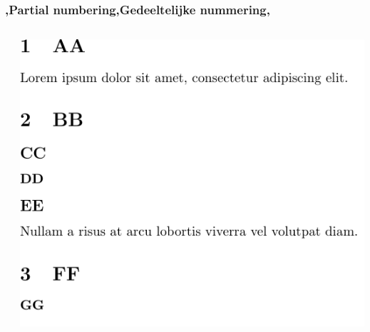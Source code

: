 \begin{frame}
    \frametitle{\lang,Partial numbering,Gedeeltelijke nummering,}
    
    \begin{columns}
        \begin{column}{0.5\textwidth}
        \end{column}
        \begin{column}{0.5\textwidth}
            \includegraphics[width=\linewidth,height=0.8\textheight,keepaspectratio]{assets/partialNumberedSecnumdepth1.pdf}
        \end{column}
    \end{columns}
\end{frame}

